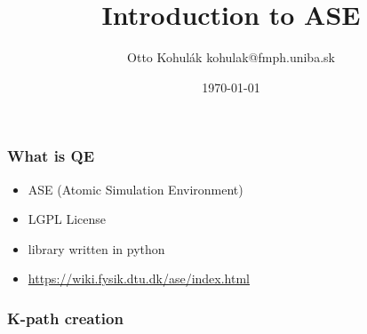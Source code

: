 \documentclass{beamer}
\begin{document}
\title{Introduction to ASE}   
\author{Otto Kohul\'{a}k \newline kohulak@fmph.uniba.sk} 
\date{\today} 

\frame{\titlepage} 

\begin{frame}
  \frametitle{What is QE}
  \begin{itemize}
    \item ASE (Atomic Simulation Environment)
    \item LGPL License
    \item library written in python
    \item \url{https://wiki.fysik.dtu.dk/ase/index.html}
  \end{itemize}
\end{frame}

\begin{frame}
  \frametitle{K-path creation}
  
\end{frame}
\end{document}
